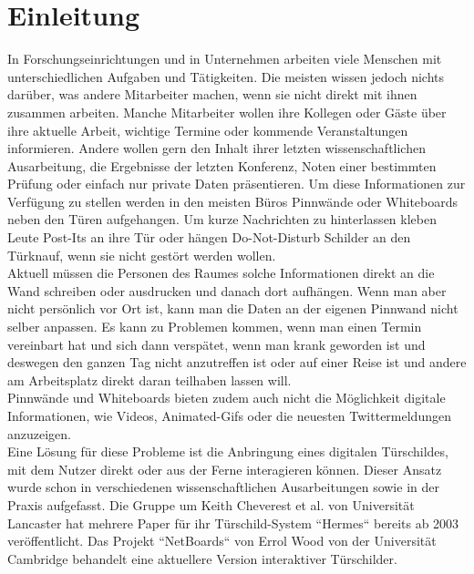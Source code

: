 \chapter{Einleitung}\label{Einleitung}
In Forschungseinrichtungen und in Unternehmen arbeiten viele Menschen mit unterschiedlichen Aufgaben und Tätigkeiten.
Die meisten wissen jedoch nichts darüber, was andere Mitarbeiter machen, wenn sie nicht direkt mit ihnen zusammen arbeiten.
Manche Mitarbeiter wollen ihre Kollegen oder Gäste über ihre aktuelle Arbeit, wichtige Termine oder kommende Veranstaltungen informieren.
Andere wollen gern den Inhalt ihrer letzten wissenschaftlichen Ausarbeitung, die Ergebnisse der letzten Konferenz, Noten einer bestimmten Prüfung oder einfach nur private Daten präsentieren.
Um diese Informationen zur Verfügung zu stellen werden in den meisten Büros Pinnwände oder Whiteboards neben den Türen aufgehangen. Um kurze Nachrichten zu hinterlassen kleben Leute Post-Its an ihre Tür oder hängen Do-Not-Disturb Schilder an den Türknauf, wenn sie nicht gestört werden wollen.\\
Aktuell müssen die Personen des Raumes solche Informationen direkt an die Wand schreiben oder ausdrucken und danach dort aufhängen.
Wenn man aber nicht persönlich vor Ort ist, kann man die Daten an der eigenen Pinnwand nicht selber anpassen.
Es kann zu Problemen kommen, wenn man einen Termin vereinbart hat und sich dann verspätet, wenn man krank geworden ist und deswegen den ganzen Tag nicht anzutreffen ist oder auf einer Reise ist und andere am Arbeitsplatz direkt daran teilhaben lassen will.\\
Pinnwände und Whiteboards bieten zudem auch nicht die Möglichkeit digitale Informationen, wie Videos, Animated-Gifs oder die neuesten Twittermeldungen anzuzeigen.\\
Eine Lösung für diese Probleme ist die Anbringung eines digitalen Türschildes, mit dem Nutzer direkt oder aus der Ferne interagieren können.
Dieser Ansatz wurde schon in verschiedenen wissenschaftlichen Ausarbeitungen sowie in der Praxis aufgefasst.
Die Gruppe um Keith Cheverest et al. von Universität Lancaster hat mehrere Paper für ihr Türschild-System ``Hermes``\cite{cheverest:2003:paper} bereits ab 2003 veröffentlicht.
Das Projekt ``NetBoards`` von Errol Wood\cite{wood:2014} von der Universität Cambridge behandelt eine aktuellere Version interaktiver Türschilder.






